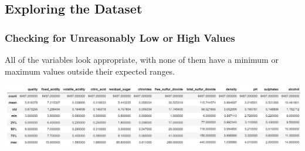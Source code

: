 \documentclass{beamer}
\begin{document}
	\subsection{Exploring the Dataset}
		\begin{frame}
		\frametitle{ Checking for Unreasonably Low or High Values }
			All of the variables look appropriate, with none of them have a minimum or maximum values outside their expected ranges.  \par
			\vspace{25pt}
		\includegraphics[width=\textwidth]{images/descriptive stats.png}
	\end{frame}
	
	
\end{document}
